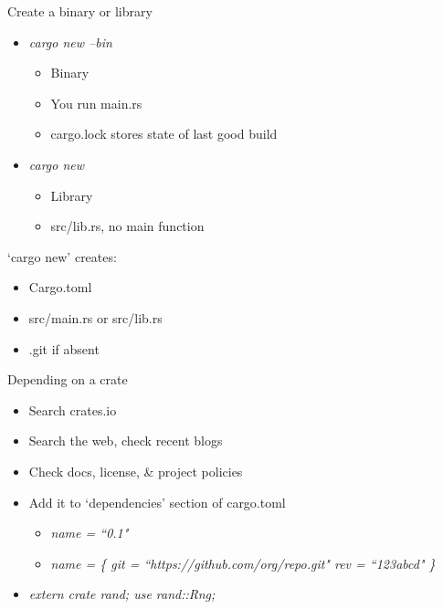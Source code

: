 \documentclass[aspectratio=169]{beamer}
\begin{document}
\begin{frame}
    Create a binary or library
    \begin{itemize}
        \item \textit{cargo new --bin}
            \begin{itemize}
                \item Binary
                \item You run main.rs
                \item cargo.lock stores state of last good build
            \end{itemize}
        \item \textit{cargo new}
            \begin{itemize}
                \item Library
                \item src/lib.rs, no main function
            \end{itemize}
    \end{itemize}
\end{frame}

\begin{frame}
    `cargo new' creates:
    \begin{itemize}
        \item Cargo.toml
        \item src/main.rs or src/lib.rs
        \item .git if absent
    \end{itemize}
\end{frame}

\begin{frame}[fragile]
    Depending on a crate
    \begin{itemize}
        \item Search crates.io
        \item Search the web, check recent blogs
        \item Check docs, license, \& project policies
        \item Add it to `dependencies' section of cargo.toml
        \begin{itemize}
            \item \textit{ name = ``0.1" }
            \item \textit{ name = \{ git = ``https://github.com/org/repo.git" rev = ``123abcd" \} }
        \end{itemize}
        \item \textit{ extern crate rand; use rand::Rng; }
    \end{itemize}
\end{frame}
\end{document}

